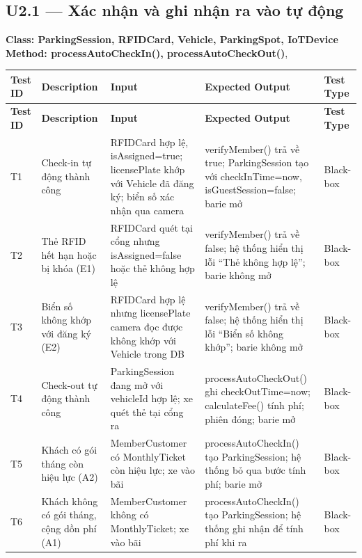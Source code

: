 \subsection{U2.1 — Xác nhận và ghi nhận ra vào tự động}
\textbf{Class: ParkingSession, RFIDCard, Vehicle, ParkingSpot, IoTDevice}
\textbf{Method: processAutoCheckIn(), processAutoCheckOut()},
\begin{longtable}{C{1.3cm} L{3cm} L{4.5cm} L{5cm} C{2.0cm}}
\toprule
\textbf{Test ID} & \textbf{Description} & \textbf{Input} & \textbf{Expected Output} & \textbf{Test Type} \\
\midrule
\endfirsthead
\toprule
\textbf{Test ID} & \textbf{Description} & \textbf{Input} & \textbf{Expected Output} & \textbf{Test Type} \\
\midrule
\endhead
\bottomrule
\endlastfoot

T1 &
Check-in tự động thành công &
RFIDCard hợp lệ, isAssigned=true; licensePlate khớp với Vehicle đã đăng ký; biển số xác nhận qua camera &
verifyMember() trả về true; ParkingSession tạo với checkInTime=now, isGuestSession=false; barie mở &
Black-box \\
\midrule

T2 &
Thẻ RFID hết hạn hoặc bị khóa (E1) &
RFIDCard quét tại cổng nhưng isAssigned=false hoặc thẻ không hợp lệ &
verifyMember() trả về false; hệ thống hiển thị lỗi ``Thẻ không hợp lệ''; barie không mở &
Black-box \\
\midrule

T3 &
Biển số không khớp với đăng ký (E2) &
RFIDCard hợp lệ nhưng licensePlate camera đọc được không khớp với Vehicle trong DB &
verifyMember() trả về false; hệ thống hiển thị lỗi ``Biển số không khớp''; barie không mở &
Black-box \\
\midrule

T4 &
Check-out tự động thành công &
ParkingSession đang mở với vehicleId hợp lệ; xe quét thẻ tại cổng ra &
processAutoCheckOut() ghi checkOutTime=now; calculateFee() tính phí; phiên đóng; barie mở &
Black-box \\
\midrule

T5 &
Khách có gói tháng còn hiệu lực (A2) &
MemberCustomer có MonthlyTicket còn hiệu lực; xe vào bãi &
processAutoCheckIn() tạo ParkingSession; hệ thống bỏ qua bước tính phí; barie mở &
Black-box \\
\midrule

T6 &
Khách không có gói tháng, cộng dồn phí (A1) &
MemberCustomer không có MonthlyTicket; xe vào bãi &
processAutoCheckIn() tạo ParkingSession; hệ thống ghi nhận để tính phí khi ra &
Black-box \\
\midrule


\end{longtable}
